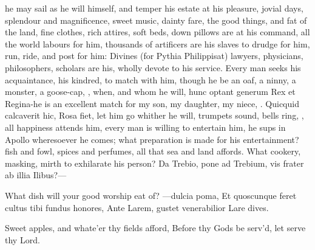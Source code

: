 {he may sail as he will himself, and temper his estate at his pleasure,
jovial days, splendour and magnificence, sweet music, dainty fare, the
good things, and fat of the land, fine clothes, rich attires, soft
beds, down pillows are at his command, all the world labours for him,
thousands of artificers are his slaves to drudge for him, run, ride,
and post for him: Divines (for Pythia Philippisat) lawyers,
physicians, philosophers, scholars are his, wholly devote to his
service. Every man seeks his acquaintance, his kindred, to match
with him, though he be an oaf, a ninny, a monster, a goose-cap, , when, and whom he will, hunc optant generum Rex et
Regina-he is an excellent match for my son, my daughter, my
niece, \etc{}. Quicquid calcaverit hic, Rosa fiet, let him go whither he
will, trumpets sound, bells ring, \etc{}, all happiness attends him, every
man is willing to entertain him, he sups in Apollo wheresoever he
comes; what preparation is made for his entertainment? fish and
fowl, spices and perfumes, all that sea and land affords. What cookery,
masking, mirth to exhilarate his person?
Da Trebio, pone ad Trebium, vis frater ab illia
Ilibus?---

What dish will your good worship eat of?
---dulcia poma,
Et quoscunque feret cultus tibi fundus honores,
Ante Larem, gustet venerabilior Lare dives.

Sweet apples, and whate'er thy fields afford,
Before thy Gods be serv'd, let serve thy Lord.

}
